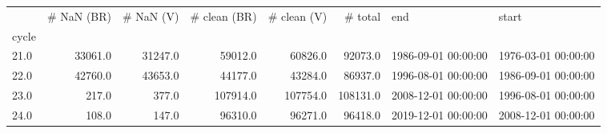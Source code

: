 \begin{tabular}{lrrrrrll}
\toprule
{} &  \# NaN (BR) &  \# NaN (V) &  \# clean (BR) &  \# clean (V) &   \# total &                  end &                start \\
cycle &             &            &               &              &           &                      &                      \\
\midrule
21.0  &     33061.0 &    31247.0 &       59012.0 &      60826.0 &   92073.0 &  1986-09-01 00:00:00 &  1976-03-01 00:00:00 \\
22.0  &     42760.0 &    43653.0 &       44177.0 &      43284.0 &   86937.0 &  1996-08-01 00:00:00 &  1986-09-01 00:00:00 \\
23.0  &       217.0 &      377.0 &      107914.0 &     107754.0 &  108131.0 &  2008-12-01 00:00:00 &  1996-08-01 00:00:00 \\
24.0  &       108.0 &      147.0 &       96310.0 &      96271.0 &   96418.0 &  2019-12-01 00:00:00 &  2008-12-01 00:00:00 \\
\bottomrule
\end{tabular}
